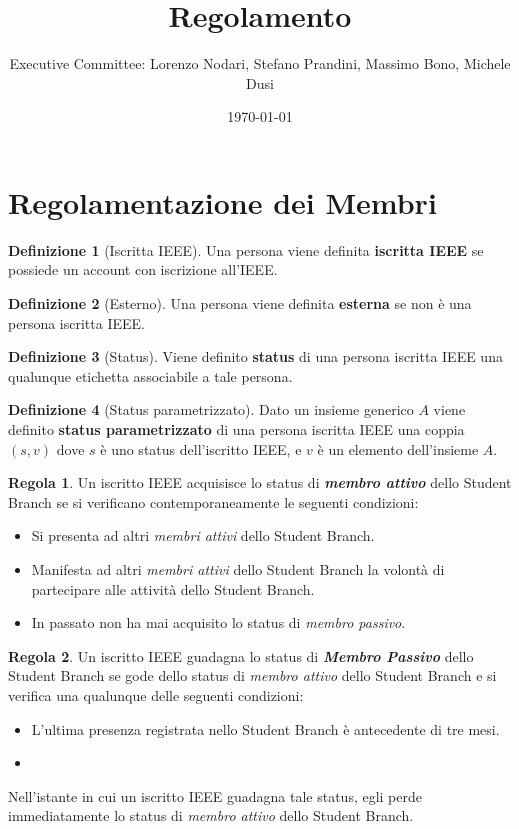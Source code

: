 \documentclass[]{article}
\title{Regolamento}
\author{Executive Committee: Lorenzo Nodari, Stefano Prandini, Massimo Bono, Michele Dusi}
\date{\today}
\theoremstyle{definition}
\newtheorem{defn}{Definizione}[section]
\newtheorem{regl}{Regola}[section]
\renewcommand{\i}[1]{\textit{#1}}
\renewcommand{\b}[1]{\textbf{#1}}
\begin{document}
\maketitle

\newpage

\section{Regolamentazione dei Membri}

\begin{defn}[Iscritta IEEE]
	Una persona viene definita \b{iscritta IEEE} se possiede un account con iscrizione all'IEEE.
\end{defn}

\begin{defn}[Esterno]
	Una persona viene definita \b{esterna} se non è una persona iscritta IEEE.
\end{defn}

\begin{defn}[Status]
	Viene definito \b{status} di una persona iscritta IEEE una qualunque etichetta associabile a tale persona.
\end{defn}

\begin{defn}[Status parametrizzato]
Dato un insieme generico $A$ viene definito \b{status parametrizzato} di una persona iscritta IEEE una coppia $(s,v)$ dove $s$ è uno status dell'iscritto IEEE, e $v$ è un elemento dell'insieme $A$.
\end{defn}

\begin{regl}
	Un iscritto IEEE acquisisce lo status di \b{\i{membro attivo}} dello Student Branch se si verificano contemporaneamente le seguenti condizioni:
	\begin{itemize}
		\item Si presenta ad altri \i{membri attivi} dello Student Branch.
		\item Manifesta ad altri \i{membri attivi} dello Student Branch la volontà di partecipare alle attività dello Student Branch.
		\item In passato non ha mai acquisito lo status di \i{membro passivo}.
	\end{itemize}
\end{regl}

\begin{regl}
	Un iscritto IEEE guadagna lo status di \b{\i{Membro Passivo}} dello Student Branch se gode dello status di \i{membro attivo} dello Student Branch e si verifica una qualunque delle seguenti condizioni:
	\begin{itemize}
		\item L'ultima presenza registrata nello Student Branch è antecedente di tre mesi.
		\item 
	\end{itemize}
	Nell'istante in cui un iscritto IEEE guadagna tale status, egli perde immediatamente lo status di \i{membro attivo} dello Student Branch.
\end{regl}
\end{document}
